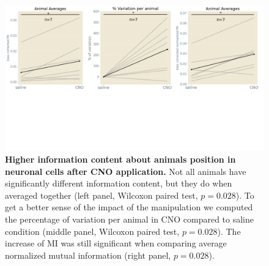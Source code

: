 \begin{figure}[h!]
    \centering
    \includegraphics[trim={0 210 0 0}, clip, width=\textwidth]{Figures/Chapter4/MI_C_averages_all_cells_2p.pdf}
    \caption[Higher information content about animals position in neuronal cells after CNO application]{\textbf{Higher information content about animals position in neuronal cells after CNO application.} 
    Not all animals have significantly different information content, but they do when averaged together (left panel, Wilcoxon paired test, $p = 0.028$).
    To get a better sense of the impact of the manipulation we computed the percentage of variation per animal in CNO compared to saline condition (middle panel, Wilcoxon paired test, $p = 0.028$).
    The increase of MI was still significant when comparing average normalized mutual information (right panel, $p = 0.028$).}
    \label{fig:chap4:average_MI_C_2p}
\end{figure}

